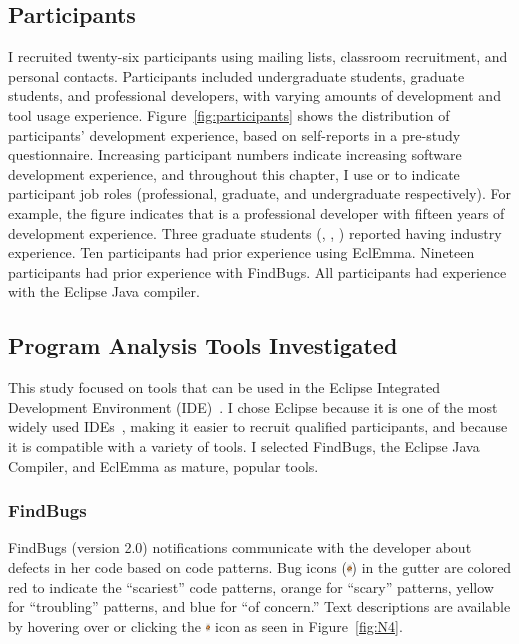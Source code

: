 \subsection{Participants} \label{participants}

I recruited twenty-six participants using mailing lists, classroom recruitment, and personal
contacts. Participants included undergraduate students, graduate students, and
professional developers, with varying amounts of development and tool
usage experience. Figure~\ref{fig:participants} shows the distribution of
participants' development experience, based on self-reports in a pre-study
questionnaire. 
Increasing participant numbers indicate increasing software development experience,
and throughout this chapter, I use  or  
 to indicate participant job roles (professional, graduate, and undergraduate respectively).
For example, the figure indicates that  is a professional developer with fifteen years of development experience. 
Three graduate students (, , ) reported having industry experience.
Ten participants had prior experience using EclEmma. 
Nineteen participants had prior experience with FindBugs. 
All participants had experience with the Eclipse Java compiler.

\subsection{Program Analysis Tools Investigated} \label{TUI}

This study focused on tools that can be used in the Eclipse
Integrated Development Environment (IDE)~\cite{EclipseIDE}. 
I chose Eclipse because it is one of the most widely used IDEs~\cite{Goth:2005:Beware}, 
making it easier to recruit qualified participants,
and because it is compatible with a variety of tools. I selected FindBugs, the Eclipse Java Compiler, and
EclEmma as mature, popular tools.


\subsubsection*{FindBugs}

FindBugs (version 2.0) notifications communicate with the developer about defects in her
code based on code patterns. Bug icons (\includegraphics[height=9px]{Chapter-4/figs/bug}) in the gutter are colored red
to indicate the ``scariest'' code patterns, orange for ``scary'' patterns, yellow
for ``troubling'' patterns, and blue for ``of concern.'' Text descriptions are
available by hovering over or clicking the \includegraphics[height=9px]{Chapter-4/figs/bug} icon as seen in Figure~\ref{fig:N4}.

